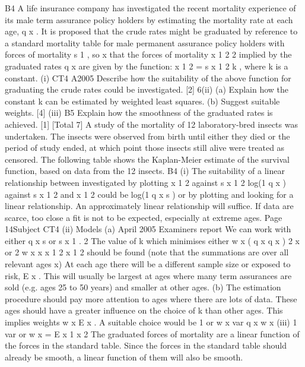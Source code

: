 \documentclass[a4paper,12pt]{article}
\begin{document}
\begin{enumerate}
B4
A life insurance company has investigated the recent mortality experience of its male
term assurance policy holders by estimating the mortality rate at each age, q x . It is
proposed that the crude rates might be graduated by reference to a standard mortality
table for male permanent assurance policy holders with forces of mortality s 1 , so
x
that the forces of mortality
x
1
2
2
implied by the graduated rates q x are given by the
function:
x
1
2
=
s
x
1
2
k ,
where k is a constant.
(i)
CT4 A2005
Describe how the suitability of the above function for graduating the crude
rates could be investigated.
[2]
6(ii)
(a) Explain how the constant k can be estimated by weighted least squares.
(b) Suggest suitable weights.
[4]
(iii)
B5
Explain how the smoothness of the graduated rates is achieved.
[1]
[Total 7]
A study of the mortality of 12 laboratory-bred insects was undertaken. The insects
were observed from birth until either they died or the period of study ended, at which
point those insects still alive were treated as censored.
The following table shows the Kaplan-Meier estimate of the survival function, based
on data from the 12 insects.
B4
(i)
The suitability of a linear relationship between
investigated by plotting
x
1
2
against
s
x
1
2
log(1 q x ) against
s
x
1
2
and
x
1
2
could be
log(1 q x s ) or by plotting
and
looking for a linear relationship.
An approximately linear relationship will suffice.
If data are scarce, too close a fit is not to be expected, especially at extreme
ages.
Page 14Subject CT4
(ii)
Models
(a)
April 2005
Examiners report
We can work with either q x s or
s
x
1 .
2
The value of k which minimises either
w x ( q x q x ) 2
x
or
2
w x
x
x
1
2
x
1
2
should be found (note that the summations are over all relevant ages x)
At each age there will be a different sample size or exposed to risk, E x .
This will usually be largest at ages where many term assurances are
sold (e.g. ages 25 to 50 years) and smaller at other ages.
(b)
The estimation procedure should pay more attention to ages where
there are lots of data. These ages should have a greater influence on
the choice of k than other ages.
This implies weights w x E x .
A suitable choice would be
1
or w x
var q x
w x
(iii)
1
var
or w x = E x
1
x
2
The graduated forces of mortality are a linear function of the forces in the
standard table.
Since the forces in the standard table should already be smooth, a linear
function of them will also be smooth.

\end{enumerate}
\end{document}
